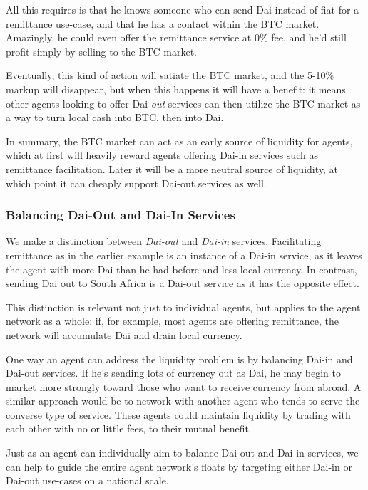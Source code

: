 \documentclass{article}
\begin{document}
All this requires is that he knows someone who can send Dai instead of fiat for a remittance use-case, and that he has a contact within the BTC market. Amazingly, he could even offer the remittance service at 0\% fee, and he'd still profit simply by selling to the BTC market.

Eventually, this kind of action will satiate the BTC market, and the 5-10\% markup will disappear, but when this happens it will have a benefit: it means other agents looking to offer Dai-\textit{out} services can then utilize the BTC market as a way to turn local cash into BTC, then into Dai.

In summary, the BTC market can act as an early source of liquidity for agents, which at first will heavily reward agents offering Dai-in services such as remittance facilitation. Later it will be a more neutral source of liquidity, at which point it can cheaply support Dai-out services as well.

\subsubsection{Balancing Dai-Out and Dai-In Services} \label{dai-out dai-in}

We make a distinction between \textit{Dai-out} and \textit{Dai-in} services. Facilitating remittance as in the earlier example is an instance of a Dai-in service, as it leaves the agent with more Dai than he had before and less local currency. In contrast, sending Dai out to South Africa is a Dai-out service as it has the opposite effect.

This distinction is relevant not just to individual agents, but applies to the agent network as a whole: if, for example, most agents are offering remittance, the network will accumulate Dai and drain local currency.

One way an agent can address the liquidity problem is by balancing Dai-in and Dai-out services. If he's sending lots of currency out as Dai, he may begin to market more strongly toward those who want to receive currency from abroad. A similar approach would be to network with another agent who tends to serve the converse type of service. These agents could maintain liquidity by trading with each other with no or little fees, to their mutual benefit.

Just as an agent can individually aim to balance Dai-out and Dai-in services, we can help to guide the entire agent network's floats by targeting either Dai-in or Dai-out use-cases on a national scale.
\end{document}
